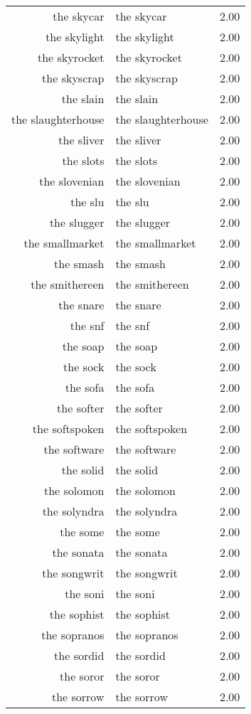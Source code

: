 \begin{table}[ht]
\begin{tabular}{rlr}
  the skycar & the skycar & 2.00 \\ 
  the skylight & the skylight & 2.00 \\ 
  the skyrocket & the skyrocket & 2.00 \\ 
  the skyscrap & the skyscrap & 2.00 \\ 
  the slain & the slain & 2.00 \\ 
  the slaughterhouse & the slaughterhouse & 2.00 \\ 
  the sliver & the sliver & 2.00 \\ 
  the slots & the slots & 2.00 \\ 
  the slovenian & the slovenian & 2.00 \\ 
  the slu & the slu & 2.00 \\ 
  the slugger & the slugger & 2.00 \\ 
  the smallmarket & the smallmarket & 2.00 \\ 
  the smash & the smash & 2.00 \\ 
  the smithereen & the smithereen & 2.00 \\ 
  the snare & the snare & 2.00 \\ 
  the snf & the snf & 2.00 \\ 
  the soap & the soap & 2.00 \\ 
  the sock & the sock & 2.00 \\ 
  the sofa & the sofa & 2.00 \\ 
  the softer & the softer & 2.00 \\ 
  the softspoken & the softspoken & 2.00 \\ 
  the software & the software & 2.00 \\ 
  the solid & the solid & 2.00 \\ 
  the solomon & the solomon & 2.00 \\ 
  the solyndra & the solyndra & 2.00 \\ 
  the some & the some & 2.00 \\ 
  the sonata & the sonata & 2.00 \\ 
  the songwrit & the songwrit & 2.00 \\ 
  the soni & the soni & 2.00 \\ 
  the sophist & the sophist & 2.00 \\ 
  the sopranos & the sopranos & 2.00 \\ 
  the sordid & the sordid & 2.00 \\ 
  the soror & the soror & 2.00 \\ 
  the sorrow & the sorrow & 2.00 \\ 

\end{tabular}
\end{table}
